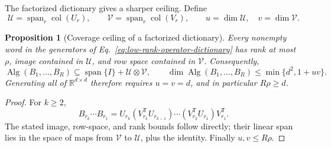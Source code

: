 \documentclass[10pt]{article}
\newcommand{\Span}{\operatorname{span}}
\newtheorem{proposition}[theorem]{Proposition}
\theoremstyle{definition}
\theoremstyle{remark}
\begin{document}
The factorized dictionary gives a sharper ceiling.  Define
\begin{equation}
\mathcal U=\Span_r\operatorname{col}(U_r),
\qquad
\mathcal V=\Span_r\operatorname{col}(V_r),
\qquad u=\dim\mathcal U,\quad v=\dim\mathcal V.
\label{eq:dictionary-coverage-spaces}
\end{equation}

\begin{proposition}[Coverage ceiling of a factorized dictionary]
\label{prop:dictionary-coverage-ceiling}
Every nonempty word in the generators of Eq.~\ref{eq:low-rank-operator-dictionary} has rank at most
$\rho$, image contained in $\mathcal U$, and row space contained in $\mathcal V$.  Consequently,
\begin{equation}
\operatorname{Alg}(B_1,\ldots,B_R)
\subseteq\Span\{I\}+\mathcal U\otimes\mathcal V,
\qquad
\dim\operatorname{Alg}(B_1,\ldots,B_R)
\leq\min\{d^2,1+uv\}.
\label{eq:dictionary-algebra-ceiling}
\end{equation}
Generating all of $\mathbb R^{d\times d}$ therefore requires $u=v=d$, and in particular
$R\rho\geq d$.
\end{proposition}

\begin{proof}
For $k\geq2$,
\begin{equation}
B_{r_k}\cdots B_{r_1}
=U_{r_k}
\left(V_{r_k}^{\mathsf T}U_{r_{k-1}}\right)\cdots
\left(V_{r_2}^{\mathsf T}U_{r_1}\right)V_{r_1}^{\mathsf T}.
\label{eq:factorized-word}
\end{equation}
The stated image, row-space, and rank bounds follow directly; their linear span lies in the space
of maps from $\mathcal V$ to $\mathcal U$, plus the identity.  Finally
$u,v\leq R\rho$.
\end{proof}
\end{document}
